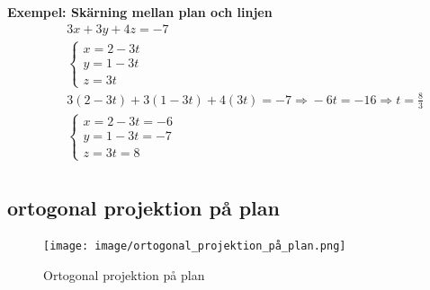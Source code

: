 \textbf{Exempel: Skärning mellan plan och linjen} %
\begin{align*} %
  &\quad  3x+3y+4z=-7 \\
  &\quad  \left\{\begin{array}{r}
  x = 2-3t \\
  y = 1-3t \\
  z = 3t
  \end{array}\right. \\
  &\quad  3(2- 3t)+3(1 -3t)+4(3t)=-7 \Rightarrow{} -6t=-16  \Rightarrow{} t=\frac{8}{3} \\
  &\quad  \left\{\begin{array}{r}
  x = 2-3t = -6 \\
  y = 1-3t = -7 \\
  z = 3t = 8 
  \end{array}\right. \\
\end{align*}



\newpage

\subsection{ortogonal projektion på plan}
\begin{figure}[h]
    \vspace{10mm}
    \centering
    \texttt{[image: image/ortogonal\_projektion\_på\_plan.png]} 
    \caption{Ortogonal projektion på plan}
\end{figure}

